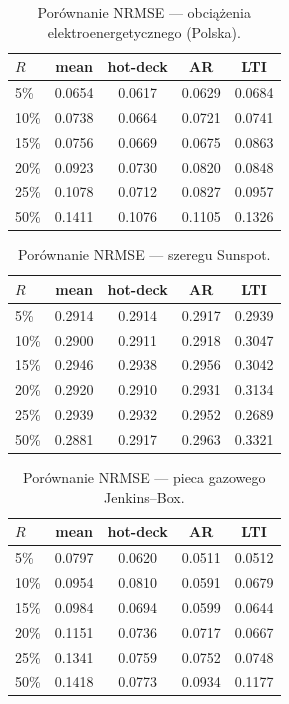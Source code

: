 \begin{table}[htbp]
  \centering
  \caption{Porównanie NRMSE --- obciążenia elektroenergetycznego (Polska).}
  \label{tab:rule01-poland}
  \begin{tabular}{lcccc}
    \hline
    $R$ & mean & hot-deck & AR & LTI \\
    \hline
    5\% & 0.0654 & 0.0617 & 0.0629 & 0.0684 \\
    10\% & 0.0738 & 0.0664 & 0.0721 & 0.0741 \\
    15\% & 0.0756 & 0.0669 & 0.0675 & 0.0863 \\
    20\% & 0.0923 & 0.0730 & 0.0820 & 0.0848 \\
    25\% & 0.1078 & 0.0712 & 0.0827 & 0.0957 \\
    50\% & 0.1411 & 0.1076 & 0.1105 & 0.1326 \\
    \hline
  \end{tabular}
\end{table}

\begin{table}[htbp]
  \centering
  \caption{Porównanie NRMSE --- szeregu Sunspot.}
  \label{tab:rule01-sunspot}
  \begin{tabular}{lcccc}
    \hline
    $R$ & mean & hot-deck & AR & LTI \\
    \hline
    5\% & 0.2914 & 0.2914 & 0.2917 & 0.2939 \\
    10\% & 0.2900 & 0.2911 & 0.2918 & 0.3047 \\
    15\% & 0.2946 & 0.2938 & 0.2956 & 0.3042 \\
    20\% & 0.2920 & 0.2910 & 0.2931 & 0.3134 \\
    25\% & 0.2939 & 0.2932 & 0.2952 & 0.2689 \\
    50\% & 0.2881 & 0.2917 & 0.2963 & 0.3321 \\
    \hline
  \end{tabular}
\end{table}

\begin{table}[htbp]
  \centering
  \caption{Porównanie NRMSE --- pieca gazowego Jenkins--Box.}
  \label{tab:rule01-gas}
  \begin{tabular}{lcccc}
    \hline
    $R$ & mean & hot-deck & AR & LTI \\
    \hline
    5\% & 0.0797 & 0.0620 & 0.0511 & 0.0512 \\
    10\% & 0.0954 & 0.0810 & 0.0591 & 0.0679 \\
    15\% & 0.0984 & 0.0694 & 0.0599 & 0.0644 \\
    20\% & 0.1151 & 0.0736 & 0.0717 & 0.0667 \\
    25\% & 0.1341 & 0.0759 & 0.0752 & 0.0748 \\
    50\% & 0.1418 & 0.0773 & 0.0934 & 0.1177 \\
    \hline
  \end{tabular}
\end{table}

